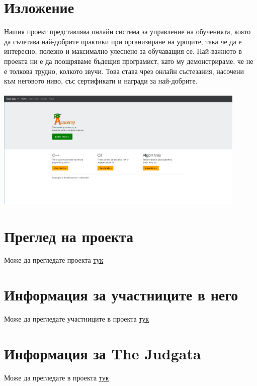 \documentclass[28pt]{article}
\begin{document}
\section{Изложение}
Нашия проект представлява онлайн система за управление на обученията, която да съчетава най-добрите практики при организиране на уроците, така че да е интересно, полезно и максимално улеснено за обучаващия се. Най-важното в проекта ни е да поощряваме бъдещия програмист, като му демонстрираме, че не е толкова трудно, колкото звучи. Това става чрез онлайн състезания, насочени към неговото ниво, със сертификати и награди за най-добрите. \\\vspace {3cm} \\
\includegraphics[width=0.9\textwidth]{academy} \\
\section{Преглед на проекта}
Може да прегледате проекта \href{https://infocourse.techedu.cf}{тук} 
\section{Информация за участниците в него}
Може да прегледате участниците в проекта \href{https://techedu.cf}{тук} 
\section{Информация за \foreignlanguage{english}{The Judgata}}
Може да прегледате  в проекта \href{https://judge.techedu.cf}{тук} 
\newpage
\end{document}
